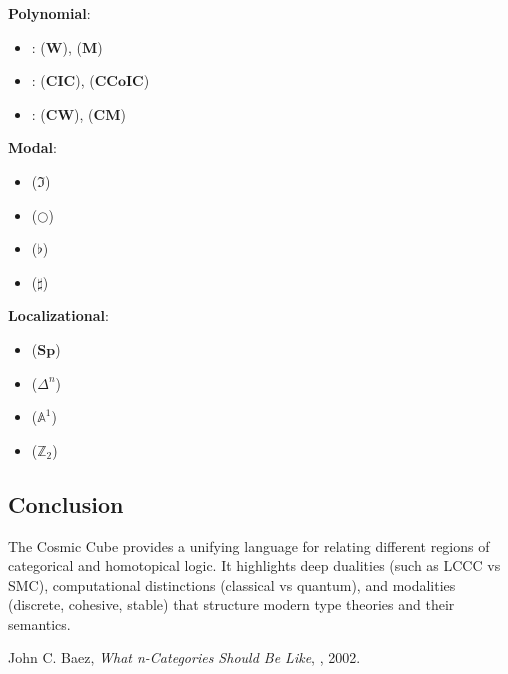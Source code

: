 \documentclass{article}
\begin{document}
\noindent \textbf{Polynomial}:
\begin{itemize}
\item {}:  ($\mathbf{W}$),  ($\mathbf{M}$)
\item {}:  ($\mathbf{CIC}$),  ($\mathbf{CCoIC}$)
\item {}:  ($\mathbf{CW}$),  ($\mathbf{CM}$)
\end{itemize}

\noindent \textbf{Modal}:
\begin{itemize}
\item {} ($\Im$)
\item {} ($\bigcirc$)
\item {} ($\flat$)
\item {} ($\sharp$)
\end{itemize}

\noindent \textbf{Localizational}:
\begin{itemize}
\item {} ($\mathbf{Sp}$)
\item {} ($\mathbb{\Delta}^n$)
\item {} ($\mathbb{A}^1$)
\item {} ($\mathbb{Z}_2$)
\end{itemize}

\subsection{Conclusion}
The Cosmic Cube provides a unifying language for relating different regions
of categorical and homotopical logic. It highlights deep dualities (such as
LCCC vs SMC), computational distinctions (classical vs quantum),
and modalities (discrete, cohesive, stable) that structure modern
type theories and their semantics.

\begin{thebibliography}{9}
 John C. Baez, \emph{What n-Categories Should Be Like}, , 2002.
\end{thebibliography}
\end{document}
